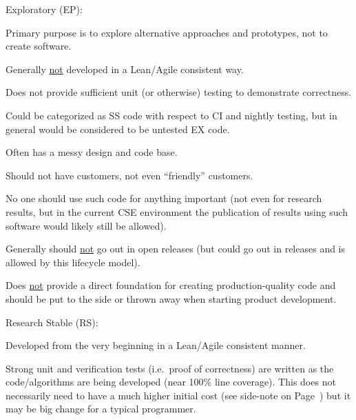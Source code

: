 \documentclass[11pt]{SANDreport}
\begin{document}
\begin{compactenum}

{}\item Exploratory (EP):

\begin{compactitem}

{}\item Primary purpose is to explore alternative approaches and prototypes, not to create software.

{}\item Generally {}\underline{not} developed in a Lean/Agile consistent way.

{}\item Does not provide sufficient unit (or otherwise) testing to demonstrate correctness.

{}\item Could be categorized as SS code with respect to CI and nightly testing, but in general would be considered to be untested EX code.

{}\item Often has a messy design and code base.

{}\item Should not have  customers, not even ``friendly'' customers.

{}\item No one should use such code for anything important (not even for research results, but in the current CSE environment the publication of results using such software would likely still be allowed).

{}\item Generally should {}\underline{not} go out in open releases (but could go out in releases and is allowed by this lifecycle model).

{}\item Does {}\underline{not} provide a direct foundation for creating production-quality code and should be put to the side or thrown away when starting product development.

\end{compactitem}

{}\item Research Stable (RS):

\begin{compactitem}

{}\item Developed from the very beginning in a Lean/Agile consistent
manner.

{}\item Strong unit and verification tests (i.e.\ proof of correctness) are written as the code/algorithms are being developed (near 100\% line coverage).  This does not necessarily need to have a much higher initial cost (see side-note on Page~\pageref{levels_of_unit_testing}) but it may be big change for a typical programmer.


\end{compactitem}
\end{compactenum}
\end{document}
